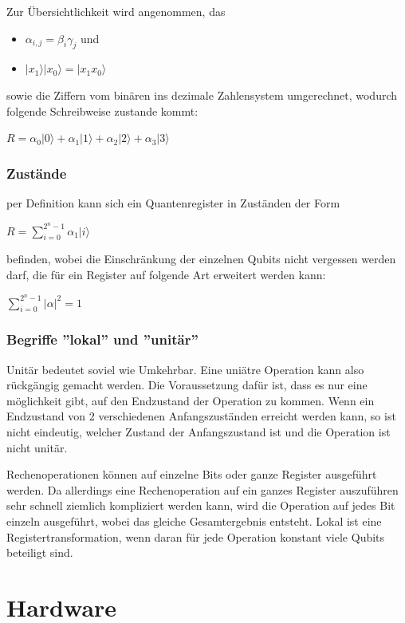Zur Übersichtlichkeit wird angenommen, das
\begin{itemize}
	\item $\alpha_{i,j} = \beta_i\gamma_j$ und
	\item $|x_1\rangle|x_0\rangle = |x_1 x_0\rangle$
\end{itemize}
sowie die Ziffern vom binären ins dezimale Zahlensystem umgerechnet, wodurch folgende Schreibweise zustande kommt:

$R = \alpha_0|0\rangle+\alpha_1|1\rangle+\alpha_2|2\rangle+\alpha_3|3\rangle$


\subsubsection{Zustände}
\label{sec:Zustaende}

per Definition kann sich ein Quantenregister in Zuständen der Form

$R = \displaystyle\sum_{i=0}^{2^n-1} \alpha_1|i\rangle$

befinden, wobei die Einschränkung der einzelnen Qubits nicht vergessen werden darf, die für ein Register auf folgende Art erweitert werden kann:

$\displaystyle\sum_{i=0}^{2^n-1}  |\alpha|^2 = 1$


\subsubsection{Begriffe ''lokal'' und ''unitär''}
\label{sec:Begriffe lokal unitaer}

Unitär bedeutet soviel wie Umkehrbar. Eine uniätre Operation kann also rückgängig gemacht werden. Die Voraussetzung dafür ist, dass es nur eine möglichkeit gibt, auf den Endzustand der Operation zu kommen. Wenn ein Endzustand von 2 verschiedenen Anfangszuständen erreicht werden kann, so ist nicht eindeutig, welcher Zustand der Anfangszustand ist und die Operation ist nicht unitär.

Rechenoperationen können auf einzelne Bits oder ganze Register ausgeführt werden. Da allerdings eine Rechenoperation auf ein ganzes Register auszuführen sehr schnell ziemlich kompliziert werden kann, wird die Operation auf jedes Bit einzeln ausgeführt, wobei das gleiche Gesamtergebnis entsteht. Lokal ist eine Registertransformation, wenn daran für jede Operation konstant viele Qubits beteiligt sind.

\newpage

\section{Hardware}
\label{sec:hardware}

